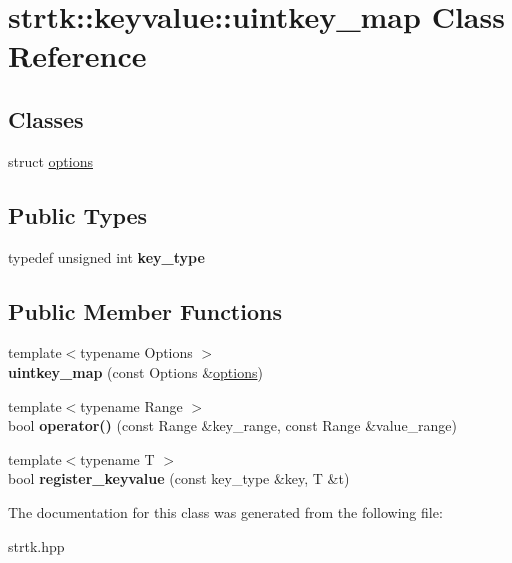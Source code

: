 \hypertarget{classstrtk_1_1keyvalue_1_1uintkey__map}{\section{strtk\-:\-:keyvalue\-:\-:uintkey\-\_\-map Class Reference}
\label{classstrtk_1_1keyvalue_1_1uintkey__map}
}
\subsection*{Classes}
\begin{DoxyCompactItemize}
\item 
struct \hyperlink{structstrtk_1_1keyvalue_1_1uintkey__map_1_1options}{options}
\end{DoxyCompactItemize}
\subsection*{Public Types}
\begin{DoxyCompactItemize}
\item 
\hypertarget{classstrtk_1_1keyvalue_1_1uintkey__map_affec4bd2f1ca72cb2409479bddd7ce03}{typedef unsigned int {\bfseries key\-\_\-type}}\label{classstrtk_1_1keyvalue_1_1uintkey__map_affec4bd2f1ca72cb2409479bddd7ce03}

\end{DoxyCompactItemize}
\subsection*{Public Member Functions}
\begin{DoxyCompactItemize}
\item 
\hypertarget{classstrtk_1_1keyvalue_1_1uintkey__map_a2d2e4ddfd9d00591afae7d7dfe8b45fd}{{\footnotesize template$<$typename Options $>$ }\\{\bfseries uintkey\-\_\-map} (const Options \&\hyperlink{structstrtk_1_1keyvalue_1_1uintkey__map_1_1options}{options})}\label{classstrtk_1_1keyvalue_1_1uintkey__map_a2d2e4ddfd9d00591afae7d7dfe8b45fd}

\item 
\hypertarget{classstrtk_1_1keyvalue_1_1uintkey__map_a38aedeec8c9a0c14f27d882b646c21bd}{{\footnotesize template$<$typename Range $>$ }\\bool {\bfseries operator()} (const Range \&key\-\_\-range, const Range \&value\-\_\-range)}\label{classstrtk_1_1keyvalue_1_1uintkey__map_a38aedeec8c9a0c14f27d882b646c21bd}

\item 
\hypertarget{classstrtk_1_1keyvalue_1_1uintkey__map_a389c36d559945f08e298723267e84062}{{\footnotesize template$<$typename T $>$ }\\bool {\bfseries register\-\_\-keyvalue} (const key\-\_\-type \&key, T \&t)}\label{classstrtk_1_1keyvalue_1_1uintkey__map_a389c36d559945f08e298723267e84062}

\end{DoxyCompactItemize}


The documentation for this class was generated from the following file\-:\begin{DoxyCompactItemize}
\item 
strtk.\-hpp\end{DoxyCompactItemize}
